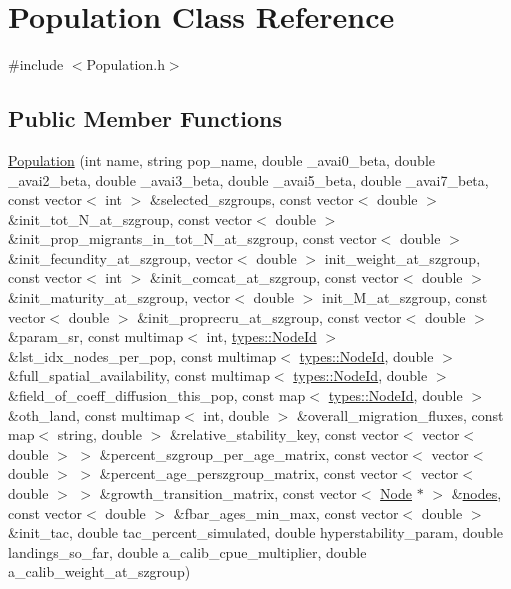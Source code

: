 \hypertarget{class_population}{}\section{Population Class Reference}
\label{class_population}


{\ttfamily \#include $<$Population.\+h$>$}

\subsection*{Public Member Functions}
\begin{DoxyCompactItemize}
\item 
\mbox{\hyperlink{class_population_a25d653ae9ea3b940e0df5b10d2d3213a}{Population}} (int name, string pop\+\_\+name, double \+\_\+avai0\+\_\+beta, double \+\_\+avai2\+\_\+beta, double \+\_\+avai3\+\_\+beta, double \+\_\+avai5\+\_\+beta, double \+\_\+avai7\+\_\+beta, const vector$<$ int $>$ \&selected\+\_\+szgroups, const vector$<$ double $>$ \&init\+\_\+tot\+\_\+\+N\+\_\+at\+\_\+szgroup, const vector$<$ double $>$ \&init\+\_\+prop\+\_\+migrants\+\_\+in\+\_\+tot\+\_\+\+N\+\_\+at\+\_\+szgroup, const vector$<$ double $>$ \&init\+\_\+fecundity\+\_\+at\+\_\+szgroup, vector$<$ double $>$ init\+\_\+weight\+\_\+at\+\_\+szgroup, const vector$<$ int $>$ \&init\+\_\+comcat\+\_\+at\+\_\+szgroup, const vector$<$ double $>$ \&init\+\_\+maturity\+\_\+at\+\_\+szgroup, vector$<$ double $>$ init\+\_\+\+M\+\_\+at\+\_\+szgroup, const vector$<$ double $>$ \&init\+\_\+proprecru\+\_\+at\+\_\+szgroup, const vector$<$ double $>$ \&param\+\_\+sr, const multimap$<$ int, \mbox{\hyperlink{classtypes_1_1_node_id}{types\+::\+Node\+Id}} $>$ \&lst\+\_\+idx\+\_\+nodes\+\_\+per\+\_\+pop, const multimap$<$ \mbox{\hyperlink{classtypes_1_1_node_id}{types\+::\+Node\+Id}}, double $>$ \&full\+\_\+spatial\+\_\+availability, const multimap$<$ \mbox{\hyperlink{classtypes_1_1_node_id}{types\+::\+Node\+Id}}, double $>$ \&field\+\_\+of\+\_\+coeff\+\_\+diffusion\+\_\+this\+\_\+pop, const map$<$ \mbox{\hyperlink{classtypes_1_1_node_id}{types\+::\+Node\+Id}}, double $>$ \&oth\+\_\+land, const multimap$<$ int, double $>$ \&overall\+\_\+migration\+\_\+fluxes, const map$<$ string, double $>$ \&relative\+\_\+stability\+\_\+key, const vector$<$ vector$<$ double $>$ $>$ \&percent\+\_\+szgroup\+\_\+per\+\_\+age\+\_\+matrix, const vector$<$ vector$<$ double $>$ $>$ \&percent\+\_\+age\+\_\+perszgroup\+\_\+matrix, const vector$<$ vector$<$ double $>$ $>$ \&growth\+\_\+transition\+\_\+matrix, const vector$<$ \mbox{\hyperlink{class_node}{Node}} $\ast$ $>$ \&\mbox{\hyperlink{thread__vessels_8cpp_ace5675146c8515428d094fd142d8a2d2}{nodes}}, const vector$<$ double $>$ \&fbar\+\_\+ages\+\_\+min\+\_\+max, const vector$<$ double $>$ \&init\+\_\+tac, double tac\+\_\+percent\+\_\+simulated, double hyperstability\+\_\+param, double landings\+\_\+so\+\_\+far, double a\+\_\+calib\+\_\+cpue\+\_\+multiplier, double a\+\_\+calib\+\_\+weight\+\_\+at\+\_\+szgroup)

\end{DoxyCompactItemize}
